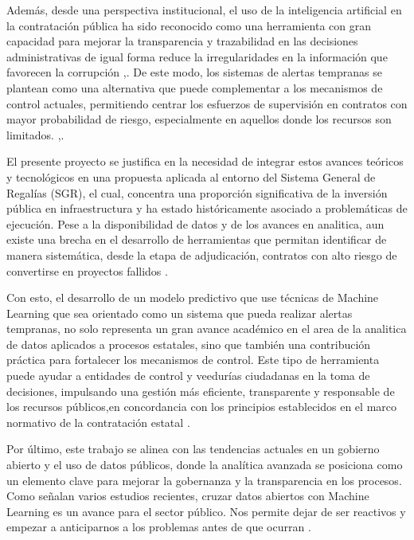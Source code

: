 Además, desde una perspectiva institucional, el uso de la inteligencia artificial en la contratación pública ha sido reconocido como una herramienta con gran capacidad para mejorar la transparencia y trazabilidad en las decisiones administrativas de igual forma reduce la irregularidades en la información que favorecen la corrupción \cite{calderon2025contratacion},\cite{sierra2025contratacion}. De este modo, los sistemas de alertas tempranas se plantean como una alternativa que puede complementar a los mecanismos de control actuales, permitiendo centrar los esfuerzos de supervisión en contratos con mayor probabilidad de riesgo, especialmente en aquellos donde los recursos son limitados. \cite{gallego2021preventing},\cite{ospina2024percepcion}.

El presente proyecto se justifica en la necesidad de integrar estos avances teóricos y tecnológicos en una propuesta aplicada al entorno del Sistema General de Regalías (SGR), el cual, concentra una proporción significativa de la inversión pública en infraestructura y ha estado históricamente asociado a problemáticas de ejecución. Pese a la disponibilidad de datos y de los avances en analitica, aun existe una brecha en el desarrollo de herramientas que permitan identificar de manera sistemática, desde la etapa de adjudicación, contratos con alto riesgo de convertirse en proyectos fallidos  .

Con esto, el desarrollo de un modelo predictivo que use técnicas de Machine Learning que sea orientado como un sistema que pueda realizar alertas tempranas, no solo representa un gran avance académico en el area de la analitica de datos aplicados a procesos estatales, sino que también una contribución práctica para fortalecer los mecanismos de control. Este tipo de herramienta puede ayudar a entidades de control y veedurías ciudadanas en la toma de decisiones,  impulsando una gestión más eficiente, transparente y responsable de los recursos públicos,en concordancia con los principios establecidos en el marco normativo de la contratación estatal \cite{ospina2024percepcion}.

Por último, este trabajo se alinea con las tendencias actuales en un gobierno abierto y el uso de datos públicos, donde la analítica avanzada se posiciona como un elemento clave para mejorar la gobernanza y la transparencia en los procesos. Como señalan varios estudios recientes, cruzar datos abiertos con Machine Learning es un avance  para el sector público. Nos permite dejar de ser reactivos y empezar a anticiparnos a los problemas antes de que ocurran \cite{lyra2022fraud}.